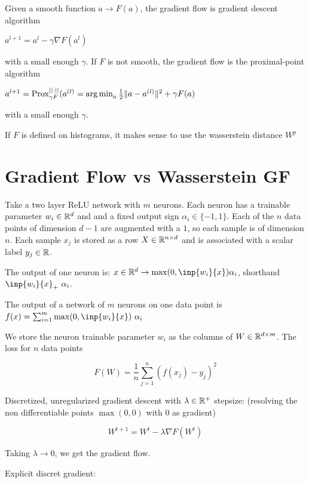 Given a smooth function $a \rightarrow F(a)$, the gradient flow is gradient descent algorithm

$a^{l+1} = a^l - \gamma \nabla F(a^l)$

with a small enough $\gamma$. If $F$ is not smooth, the gradient flow is the proximal-point algorithm

$a^{l+1} = \operatorname{Prox}^{||\cdot ||}_{\gamma F}(a^{(l)} = \operatorname*{arg\,min}_a \frac{1}{2} \lVert a - a^{(l)}\rVert^2 + \gamma F(a)$

with a small enough $\gamma$.

If $F$ is defined on histograms, it makes sense to use the wasserstein distance $W^p$

\section{Gradient Flow vs Wasserstein GF}

Take a two layer ReLU network with $m$ neurons. Each neuron has a trainable parameter $w_i \in \mathbb{R}^d$ and and a fixed output sign $\alpha_i \in \{-1, 1\}$. Each of the $n$ data points of dimension $d-1$ are augmented with a $1$, so each sample is of dimension $n$. Each sample $x_j$ is stored as a row $X \in \mathbb{R}^{n \times d}$  and is associated with a scalar label $y_j \in \mathbb{R}$.

The output of one neuron is: $x \in \R^d \rightarrow \max(0, \inp{w_i}{x}) \alpha_i$, shorthand $\inp{w_i}{x}_+ ~ \alpha_i$.

The output of a network of $m$ neurons on one data point is $f(x) = \sum_{i=1}^{m} \max(0, \inp{w_i}{x}) ~ \alpha_i$

We store the neuron trainable parameter $w_i$ as the columns of $W \in \mathbb{R}^{d \times m}$. The loss for $n$ data points

\begin{equation}
	F(W) = \frac{1}{n} \sum_{j=1}^{n} \left(f(x_j) - y_j\right)^2
\end{equation}

Discretized, unregularized gradient descent with $\lambda \in \mathbb{R}^+$ stepsize: (resolving the non differentiable points $\max(0, 0)$ with 0 as gradient)

\begin{equation}
	W^{t+1} = W^t - \lambda \nabla F(W^t)
\end{equation}

Taking $\lambda \rightarrow 0$, we get the gradient flow.

Explicit discret gradient:

